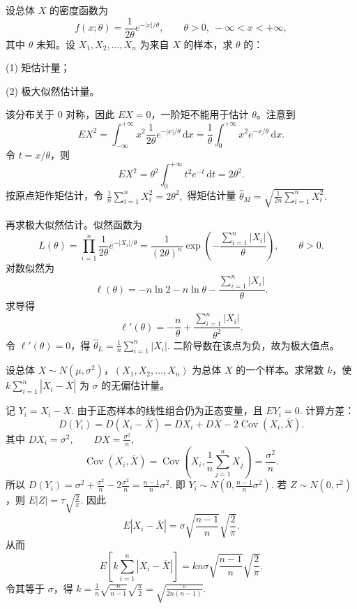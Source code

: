 \documentclass[lang=cn,11pt]{elegantbook}
\begin{document}
\begin{exercise}\label{exer:src-2008-01-3c-iv-05}\label{exer:src-paper4-iv-05}
设总体 \(X\) 的密度函数为
\[
f(x;\theta)=\frac1{2\theta}e^{-|x|/\theta},\qquad \theta>0,\ -\infty<x<+\infty,
\]
其中 \(\theta\) 未知。设 \(X_1,X_2,\dots,X_n\) 为来自 \(X\) 的样本，求 \(\theta\) 的：\par
(1) 矩估计量；\par
(2) 极大似然估计量。
\end{exercise}
\begin{solution}
该分布关于 \(0\) 对称，因此 \(EX=0\)，一阶矩不能用于估计 \(\theta\)。注意到
\[
EX^2=\int_{-\infty}^{+\infty}x^2\frac1{2\theta}e^{-|x|/\theta}\,\mathrm{d}x
=\frac1{\theta}\int_0^{+\infty}x^2e^{-x/\theta}\,\mathrm{d}x.
\]
令 \(t=x/\theta\)，则
\[
EX^2=\theta^2\int_0^{+\infty}t^2e^{-t}\,\mathrm{d}t=2\theta^2.
\]
按原点矩作矩估计，令
\(
\frac1n\sum_{i=1}^{n}X_i^2=2\theta^2,
\)
得矩估计量
\(
\hat\theta_M=\sqrt{\frac1{2n}\sum_{i=1}^{n}X_i^2}.
\)

再求极大似然估计。似然函数为
\[
L(\theta)=\prod_{i=1}^{n}\frac1{2\theta}e^{-|X_i|/\theta}
=\frac1{(2\theta)^n}\exp\!\left(-\frac{\sum_{i=1}^{n}|X_i|}{\theta}\right),
\qquad \theta>0.
\]
对数似然为
\[
\ell(\theta)=-n\ln2-n\ln\theta-\frac{\sum_{i=1}^{n}|X_i|}{\theta}.
\]
求导得
\[
\ell'(\theta)=-\frac n\theta+\frac{\sum_{i=1}^{n}|X_i|}{\theta^2}.
\]
令 \(\ell'(\theta)=0\)，得
\(
\hat\theta_L=\frac1n\sum_{i=1}^{n}|X_i|.
\)
二阶导数在该点为负，故为极大值点。
\end{solution}

\begin{exercise}\label{exer:src-2008-01-3a-iv-04}\label{exer:src-paper2-app-04}\label{prob:p2-app-04}
设总体 \(X\sim N(\mu,\sigma^2)\)，\((X_1,X_2,\dots,X_n)\) 为总体 \(X\) 的一个样本。求常数 \(k\)，使
\(
k\sum_{i=1}^{n}|X_i-\overline X|
\)
为 \(\sigma\) 的无偏估计量。
\end{exercise}
\begin{solution}
记
\(
Y_i=X_i-\overline X.
\)
由于正态样本的线性组合仍为正态变量，且
\(
EY_i=0.
\)
计算方差：
\[
D(Y_i)=D(X_i-\overline X)
=DX_i+D\overline X-2\operatorname{Cov}(X_i,\overline X).
\]
其中
\(
DX_i=\sigma^2,\qquad D\overline X=\frac{\sigma^2}{n},
\)
\[
\operatorname{Cov}(X_i,\overline X)
=\operatorname{Cov}\left(X_i,\frac1n\sum_{j=1}^n X_j\right)
=\frac{\sigma^2}{n}.
\]
所以
\(
D(Y_i)=\sigma^2+\frac{\sigma^2}{n}-2\frac{\sigma^2}{n}
=\frac{n-1}{n}\sigma^2.
\)
即
\(
Y_i\sim N\left(0,\frac{n-1}{n}\sigma^2\right).
\)
若 \(Z\sim N(0,\tau^2)\)，则
\(
E|Z|=\tau\sqrt{\frac2\pi}.
\)
因此
\[
E|X_i-\overline X|
=\sigma\sqrt{\frac{n-1}{n}}\sqrt{\frac2\pi}.
\]
从而
\[
E\left[k\sum_{i=1}^{n}|X_i-\overline X|\right]
=kn\sigma\sqrt{\frac{n-1}{n}}\sqrt{\frac2\pi}.
\]
令其等于 \(\sigma\)，得
\(
k=\frac1{n}\sqrt{\frac{n}{n-1}}\sqrt{\frac{\pi}{2}}
=\sqrt{\frac{\pi}{2n(n-1)}}.
\)
\end{solution}
\end{document}
